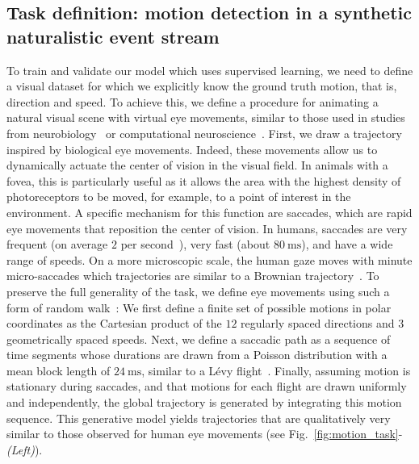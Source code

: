 \documentclass[default]{sn-jnl}%
\theoremstyle{thmstyleone}%
\theoremstyle{thmstyletwo}%
\theoremstyle{thmstylethree}%
\newcommand{\seeFig}[1]{see Fig.~\ref{fig:#1}}%
\newcommand{\ms}{\si{\milli\second}}%
\begin{document}
\subsection{Task definition: motion detection in a synthetic naturalistic event stream}\label{sec:task}
To train and validate our model which uses supervised learning, we need to define a visual dataset for which we explicitly know the ground truth motion, that is, direction and speed. To achieve this, we define a procedure for animating a natural visual scene with virtual eye movements, similar to those used in  studies from neurobiology~\citep{vinje_sparse_2000, baudot_animation_2013} or computational neuroscience~\citep{kremkow_push-pull_2016}. First, we draw a trajectory inspired by biological eye movements. Indeed, these movements allow us to dynamically actuate the center of vision in the visual field. In animals with a fovea, this is particularly useful as it allows the area with the highest density of photoreceptors to be moved, for example, to a point of interest in the environment. A specific mechanism for this function are saccades, which are rapid eye movements that reposition the center of vision. In humans, saccades are very frequent (on average $2$ per second~\citep{dandekar_neural_2012}), very fast (about $80~\ms$), and have a wide range of speeds. On a more microscopic scale, the human gaze moves with minute micro-saccades which trajectories are similar to a Brownian trajectory~\citep{poletti_head-eye_2015}. To preserve the full generality of the task, we define eye movements using such a form of random walk~\citep{engbert_integrated_2011}: We first define a finite set of possible motions in polar coordinates as the Cartesian product of the $12$ regularly spaced directions and $3$ geometrically spaced speeds. Next, we define a saccadic path as a sequence of time segments whose durations are drawn from a Poisson distribution with a mean block length of $24~\ms$, similar to a Lévy flight~\citep[p. 289]{mandelbrot_fractal_1982}.  Finally, assuming motion is stationary during saccades, and that motions for each flight are drawn uniformly and independently, the global trajectory is generated by integrating this motion sequence. This generative model yields trajectories that are qualitatively very similar to those observed for human eye movements (\seeFig{motion_task}-\textit{(Left)}).
\end{document}
